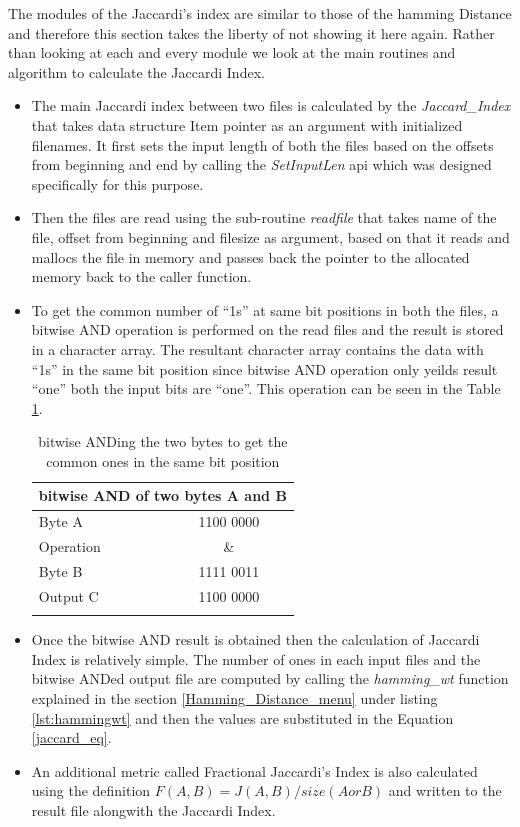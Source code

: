 	The modules of the Jaccardi's index are similar to those of the hamming Distance and therefore this section takes the liberty of not showing it here again.
	Rather than looking at each and every module we look at the main routines and algorithm to calculate the Jaccardi Index.
	\begin{itemize}
		\item The main Jaccardi index between two files is calculated by the \emph{Jaccard\_Index} that takes data structure Item pointer as an argument with initialized filenames. It first sets the input length of both the files based on the offsets from beginning and end by calling the \emph{SetInputLen} api which was designed specifically for this purpose.
		\item Then the files are read using the sub-routine \emph{readfile} that takes name of the file, offset from beginning and filesize as 		argument, based on that it reads and mallocs the file in memory and passes back the pointer to the allocated memory back to the caller function.
		\item To get the common number of ``1s'' at same bit positions in both the files, a bitwise AND operation is performed on the read files and the result is stored in a character array. The resultant character array contains the data with ``1s'' in the same bit position since bitwise AND operation only yeilds result ``one'' both the input bits are ``one''. This operation can be seen in the Table \ref{bitwise_AND}.

	\begin{table}[!ht]
	\begin{center}
	\begin{tabular}{lc}
	\toprule
	\multicolumn{2}{c}{\textbf{bitwise AND of two bytes A and B}}\\
	\midrule
	Byte A &   1100 0000 \\
	Operation & \&\\
	Byte B &   1111 0011 \\
	Output C &   1100 0000 \\
	\addlinespace
	\bottomrule
	\end{tabular}
	\end{center}
	\caption{bitwise ANDing the two bytes to get the common ones in the same bit position}
	\label{bitwise_AND}
	\end{table}

		\item Once the bitwise AND result is obtained then the calculation of Jaccardi Index is relatively simple. The number of ones in each input files and the bitwise ANDed output file are computed by calling the \emph{hamming\_wt} function explained in the section \ref{Hamming_Distance_menu} under listing \ref{lst:hammingwt} and then the values are substituted in the Equation \ref{jaccard_eq}.
	\item An additional metric called Fractional Jaccardi's Index is also calculated using the definition $F(A, B) = J(A, B)/ size(A or B)$ and written to the result file alongwith the Jaccardi Index.
\end{itemize}

